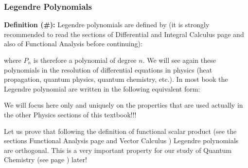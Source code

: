 	\subsubsection{Legendre Polynomials}\label{legendre polynomials}
	\textbf{Definition (\#\mydef):} Legendre polynomials are defined by (it is strongly recommended to read the sections of Differential and Integral Calculus page \pageref{differential and integral calculus} and also of Functional Analysis \pageref{functional analysis} before continuing):
	
	where $P_n$ is therefore a polynomial of degree $n$. We will see again these polynomials in the resolution of differential equations in physics (heat propagation, quantum physics, quantum chemistry, etc.). In most book the Legendre polynomial are written in the following equivalent form:
	
	We will focus here only and uniquely on the properties that are used actually in the other Physics sections of this textbook!!!
	
	Let us prove that following the definition of functional scalar product (see the sections Functional Analysis page \pageref{functional dot product} and Vector Calculus \pageref{dot product}) Legendre polynomials are orthogonal. This is a very important property for our study of Quantum Chemistry (see page \pageref{quantum chemistry rigid rotator}) later!
	
